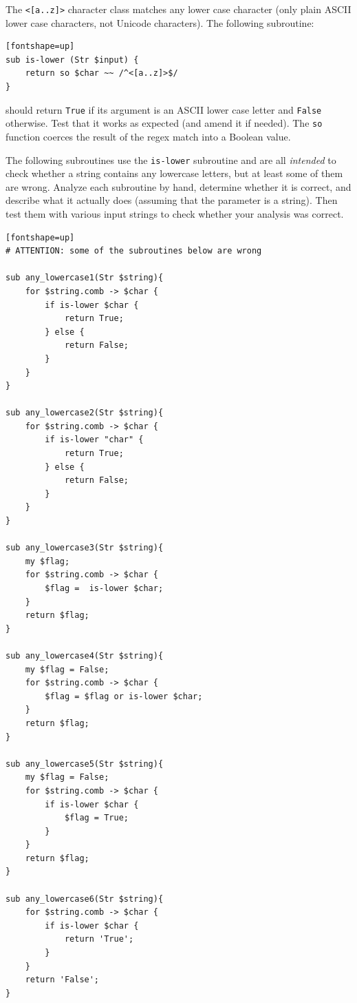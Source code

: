 \begin{exercise}

\label{islower}
The \verb'<[a..z]>' character class matches any lower case 
character (only plain ASCII lower case characters, not 
Unicode characters). The following subroutine:

\begin{verbatim}[fontshape=up]
sub is-lower (Str $input) { 
    return so $char ~~ /^<[a..z]>$/
}
\end{verbatim}

should return {\tt True} if its argument is an ASCII lower case 
letter and {\tt False} otherwise. Test that it works as 
expected (and amend it if needed). The {\tt so} function 
coerces the result of the regex match into a Boolean value.

The following subroutines use the {\tt is-lower} subroutine 
and are all {\em intended} to check 
whether a string contains any lowercase letters, but at 
least some of them are wrong.  Analyze each subroutine by hand, 
determine whether it is correct, and describe what it 
actually does (assuming that the parameter is a string). Then 
test them with various input strings to check whether your 
analysis was correct.

\begin{verbatim}[fontshape=up]
# ATTENTION: some of the subroutines below are wrong

sub any_lowercase1(Str $string){
    for $string.comb -> $char {
        if is-lower $char {
            return True;
        } else {
            return False;
        }
    }
}

sub any_lowercase2(Str $string){
    for $string.comb -> $char {
        if is-lower "char" {
            return True;
        } else {
            return False;
        }
    }
}

sub any_lowercase3(Str $string){
    my $flag;
    for $string.comb -> $char {
        $flag =  is-lower $char;
    }
    return $flag;
}

sub any_lowercase4(Str $string){
    my $flag = False;
    for $string.comb -> $char {
        $flag = $flag or is-lower $char;
    }
    return $flag;
}

sub any_lowercase5(Str $string){
    my $flag = False;
    for $string.comb -> $char {
        if is-lower $char {
            $flag = True;
        }
    }
    return $flag;
}

sub any_lowercase6(Str $string){
    for $string.comb -> $char {
        if is-lower $char {
            return 'True';
        }
    }
    return 'False';
}


\end{verbatim}
\end{exercise}

